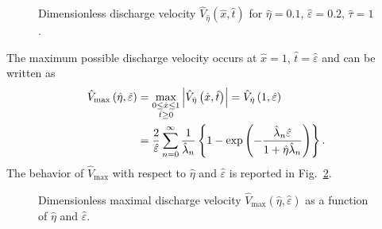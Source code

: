 \documentclass[12pt,a4paper]{amsart}
\theoremstyle{definition}
\begin{document}
\begin{figure}[h!]
\begin{center}
\caption{Dimensionless discharge velocity $\hat{V}_{\hat{\eta}}\left( \hat{x},\hat{t}%
\right) $ for $\hat{\eta}=0.1$, $\hat{\varepsilon}=0.2$, $\hat{\tau}=1$.} \label{fig:discharge_velocity_trapezoidal_pulse}
\end{center}
\end{figure}
The maximum possible discharge velocity occurs at $\hat{x}=1$, $%
\hat{t}=\hat{\varepsilon}$ and can be written as%
\begin{align}
\hat{V}_{\max }\left( \hat{\eta},\hat{\varepsilon}\right)
&=\max_{\substack{ %
0\leq \hat{x}\leq 1 \\ \hat{t}\geq 0}}\left\vert \hat{V}_{\hat{\eta}}\left(
\hat{x},\hat{t}\right) \right\vert =\hat{V}_{\hat{\eta}}\left( 1,\hat{%
\varepsilon}\right) \nonumber\\
&=\frac{2}{\hat{\varepsilon}}\sum_{n=0}^{\infty }\frac{1}{%
\hat{\lambda}_{n}}\left\{ 1-\exp \left( -\frac{\hat{\lambda}_{n}\hat{%
\varepsilon}}{1+\hat{\eta}\hat{\lambda}_{n}}\right) \right\} .\label{eq:V_max_eta_eps}
\end{align}%
The behavior of $\hat{V}_{\max } $ with respect to $\hat{\eta}$ and $\hat{\varepsilon}$ is reported in Fig.~\ref{fig:max_discharge_velocity_trapez_pulse}.
\begin{figure}[h!]
\begin{center}
\caption{Dimensionless maximal discharge velocity
$\hat{V}_{\max }\left( \hat{\eta},\hat{\varepsilon}\right)$ as a function of
$\hat{\eta}$ and $\hat{\varepsilon}$.}
\label{fig:max_discharge_velocity_trapez_pulse}
\end{center}
\end{figure}
\end{document}
